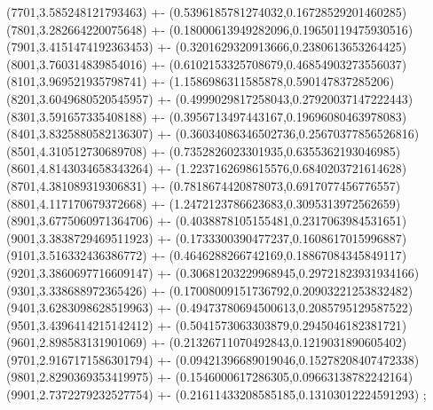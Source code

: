 {(7701,3.585248121793463) +- (0.5396185781274032,0.16728529201460285)
(7801,3.282664220075648) +- (0.18000613949282096,0.19650119475930516)
(7901,3.4151474192363453) +- (0.3201629320913666,0.2380613653264425)
(8001,3.760314839854016) +- (0.6102153325708679,0.46854903273556037)
(8101,3.969521935798741) +- (1.1586986311585878,0.590147837285206)
(8201,3.6049680520545957) +- (0.4999029817258043,0.27920037147222443)
(8301,3.591657335408188) +- (0.3956713497443167,0.19696080463978083)
(8401,3.8325880582136307) +- (0.36034086346502736,0.25670377856526816)
(8501,4.310512730689708) +- (0.7352826023301935,0.6355362193046985)
(8601,4.8143034658343264) +- (1.2237162698615576,0.6840203721614628)
(8701,4.381089319306831) +- (0.7818674420878073,0.6917077456776557)
(8801,4.117170679372668) +- (1.2472123786623683,0.3095313972562659)
(8901,3.6775060971364706) +- (0.4038878105155481,0.2317063984531651)
(9001,3.3838729469511923) +- (0.1733300390477237,0.1608617015996887)
(9101,3.516332436386772) +- (0.4646288266742169,0.18867084345849117)
(9201,3.3860697716609147) +- (0.30681203229968945,0.29721823931934166)
(9301,3.338688972365426) +- (0.17008009151736792,0.20903221253832482)
(9401,3.6283098628519963) +- (0.49473780694500613,0.2085795129587522)
(9501,3.4396414215142412) +- (0.5041573063303879,0.2945046182381721)
(9601,2.898583131901069) +- (0.21326711070492843,0.1219031890605402)
(9701,2.9167171586301794) +- (0.09421396689019046,0.15278208407472338)
(9801,2.8290369353419975) +- (0.1546000617286305,0.09663138782242164)
(9901,2.7372279232527754) +- (0.21611433208585185,0.13103012224591293)
};
